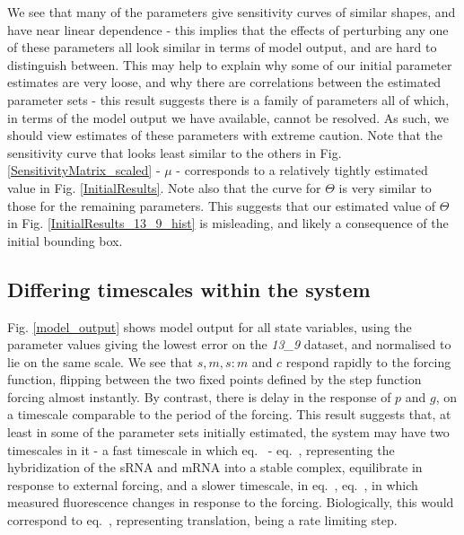 \documentclass[10pt,journal]{./IEEE_latex_class/IEEEtran}
\renewcommand{\eqref}{eq.~\originaleqref}
\begin{document}
We see that many of the parameters give sensitivity curves of similar shapes, and have near linear dependence - this implies that the effects of perturbing any one of these parameters all look similar in terms of model output, and are hard to distinguish between. This may help to explain why some of our initial parameter estimates are very loose, and why there are correlations between the estimated parameter sets - this result suggests there is a family of parameters all of which, in terms of the model output we have available, cannot be resolved. As such, we should view estimates of these parameters with extreme caution. Note that the sensitivity curve that looks least similar to the others in Fig. \ref{SensitivityMatrix_scaled} - $\mu$ - corresponds to a relatively tightly estimated value in Fig. \ref{InitialResults}. Note also that the curve for $\Theta$ is very similar to those for the remaining parameters. This suggests that our estimated value of $\Theta$ in Fig. \ref{InitialResults_13_9_hist} is misleading, and likely a consequence of the initial bounding box.

\subsection{Differing timescales within the system}

Fig. \ref{model_output} shows model output for all state variables, using the parameter values giving the lowest error on the \textit{13\_9} dataset, and normalised to lie on the same scale. We see that $s,m,s:m$ and $c$ respond rapidly to the forcing function, flipping between the two fixed points defined by the step function forcing almost instantly. By contrast, there is delay in the response of $p$ and $g$, on a timescale comparable to the period of the forcing. This result suggests that, at least in some of the parameter sets initially estimated, the system may have two timescales in it - a fast timescale in which \eqref{eq:s} - \eqref{eq:c}, representing the hybridization of the sRNA and mRNA into a stable complex, equilibrate in response to external forcing, and a slower timescale, in \eqref{eq:p}, \eqref{eq:g}, in which measured fluorescence changes in response to the forcing. Biologically, this would correspond to \eqref{eq:p}, representing translation, being a rate limiting step.
\end{document}
